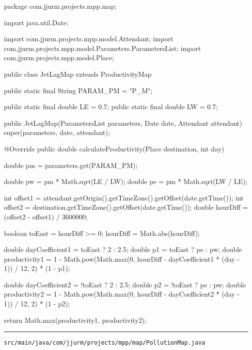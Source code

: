 \begin{javacode}
package com.jjurm.projects.mpp.map;

import java.util.Date;

import com.jjurm.projects.mpp.model.Attendant;
import com.jjurm.projects.mpp.model.Parameters.ParametersList;
import com.jjurm.projects.mpp.model.Place;

public class JetLagMap extends ProductivityMap {

  public static final String PARAM_PM = "P_M";

  public static final double LE = 0.7;
  public static final double LW = 0.7;

  public JetLagMap(ParametersList parameters, Date date, Attendant attendant) {
    super(parameters, date, attendant);
  }

  @Override
  public double calculateProductivity(Place destination, int day) {
    double pm = parameters.get(PARAM_PM);

    double pw = pm * Math.sqrt(LE / LW);
    double pe = pm * Math.sqrt(LW / LE);

    int offset1 = attendant.getOrigin().getTimeZone().getOffset(date.getTime());
    int offset2 = destination.getTimeZone().getOffset(date.getTime());
    double hourDiff = (offset2 - offset1) / 3600000;

    boolean toEast = hourDiff >= 0;
    hourDiff = Math.abs(hourDiff);

    double dayCoefficient1 = toEast ? 2 : 2.5;
    double p1 = toEast ? pe : pw;
    double productivity1 =
        1 - Math.pow(Math.max(0, hourDiff - dayCoefficient1 * (day - 1)) / 12, 2) * (1 - p1);

    double dayCoefficient2 = !toEast ? 2 : 2.5;
    double p2 = !toEast ? pe : pw;
    double productivity2 =
        1 - Math.pow(Math.max(0, hourDiff - dayCoefficient2 * (day - 1)) / 12, 2) * (1 - p2);

    return Math.max(productivity1, productivity2);
  }

}
\end{javacode}

\noindent\rule{\textwidth}{0.4pt}

\nointerlineskip
\texttt{src/main/java/com/jjurm/projects/mpp/map/PollutionMap.java}


